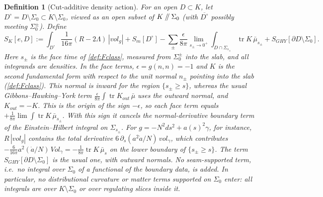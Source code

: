 \documentclass[11pt]{article}
\theoremstyle{canonmath}
\newtheorem{definition}[theorem]{Definition}
\theoremstyle{canonpostulate}
\theoremstyle{canonproposition}
\theoremstyle{canonmath}
\theoremstyle{canonproposition}
\providecommand{\cutK}{\Klein\mathbin{/\mkern-5mu/}\Sigma_0}
\providecommand{\Klein}{\mathcal{K}}
\def\mathrm#1{#1}%
\def\mathcal#1{#1}%
\begin{document}
\begin{definition}[Cut-additive density action]\label{def:action}
For an open $\mathcal{D}\subset\Klein$, let $\mathcal{D}^\circ = \mathcal{D}\setminus\Sigma_0\subset\Klein\setminus\Sigma_0$, viewed as an open subset of $\cutK$ (with $\overline{\mathcal{D}^\circ}$ possibly meeting $\Sigma_0^\pm$). Define
\begin{equation}
\mathcal{S}_{\Klein}[e,\mathcal{D}] := \int_{\mathcal{D}^\circ}\frac{1}{16\pi}(R-2\Lambda)\,|\mathrm{vol}_g| + \mathcal{S}_m[\mathcal{D}^\circ] - \sum_\pm \frac{\epsilon}{8\pi}\lim_{s_\pm\to0^+}\int_{\mathcal{D}\cap\Sigma_{s_\pm}}\operatorname{tr}K\,\bar{\mu}_{s_\pm} + \mathcal{S}_{\mathrm{GHY}}[\partial\mathcal{D}\setminus\Sigma_0].
\label{eq:action}
\end{equation}
Here $s_\pm$ is the face time of \cref{def:Fclass}, measured from $\Sigma_0^\pm$ into the slab, and all integrands are densities. In the face terms, $\epsilon = g(n,n) = -1$ and $K$ is the second fundamental form with respect to the unit normal $n_\pm$ pointing \emph{into} the slab (\cref{def:Fclass}). This normal is inward for the region $\{s_\pm\ge s\}$, whereas the usual Gibbons--Hawking--York term $\frac{\epsilon}{8\pi}\int\operatorname{tr}K_{\mathrm{out}}\,\bar\mu$ uses the outward normal, and $K_{\mathrm{out}} = -K$. This is the origin of the sign $-\epsilon$, so each face term equals $+\frac1{8\pi}\lim\int\operatorname{tr}K\,\bar\mu_{s_\pm}$. With this sign it cancels the normal-derivative boundary term of the Einstein--Hilbert integral on $\Sigma_{s_\pm}$. For $g = -N^2ds^2 + a(s)^2\gamma$, for instance, $R\,|\mathrm{vol}_g|$ contains the total derivative $6\,\partial_s(a^2\dot a/N)\,\mathrm{vol}_\gamma$, which contributes $-\frac{6}{16\pi}a^2(\dot a/N)\,\mathrm{Vol}_\gamma = -\frac1{8\pi}\operatorname{tr}K\,\bar\mu_s$ on the lower boundary of $\{s_\pm\ge s\}$. The term $\mathcal{S}_{\mathrm{GHY}}[\partial\mathcal{D}\setminus\Sigma_0]$ is the usual one, with outward normals. No seam-supported term, i.e.\ no integral over $\Sigma_0$ of a functional of the boundary data, is added. In particular, no distributional curvature or matter terms supported on $\Sigma_0$ enter: all integrals are over $\Klein\setminus\Sigma_0$ or over regulating slices inside it.
\end{definition}
\end{document}
